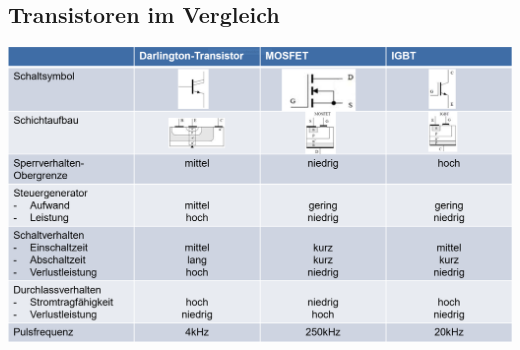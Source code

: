 \subsection{Transistoren im Vergleich}
\includegraphics[width=\linewidth]{images/transdiff}
%    
%    

\clearpage